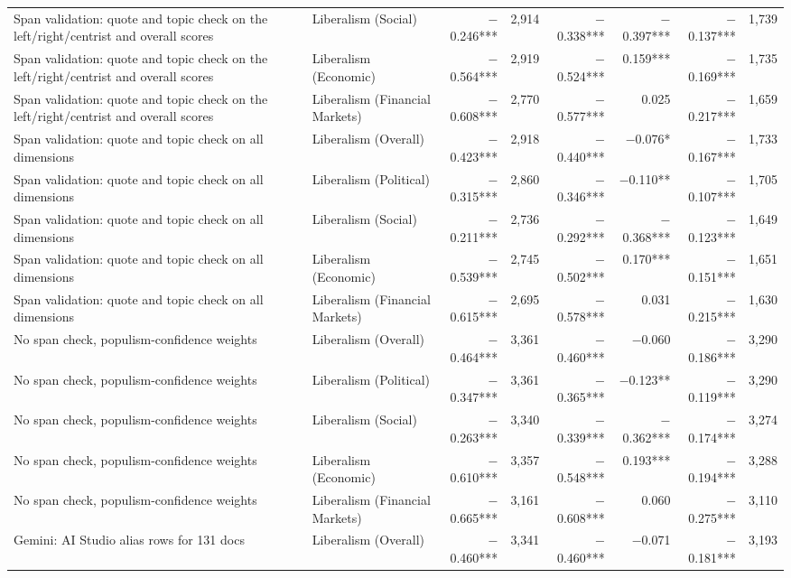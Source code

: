 \begin{table}[ht]
{\begin{tabular}{llrrrrrr}
Span validation: quote and topic check on the left/right/centrist and overall scores & Liberalism (Social) & $-$0.246*** & 2,914 & $-$0.338*** & $-$0.397*** & $-$0.137*** & 1,739 \\
Span validation: quote and topic check on the left/right/centrist and overall scores & Liberalism (Economic) & $-$0.564*** & 2,919 & $-$0.524*** & 0.159*** & $-$0.169*** & 1,735 \\
Span validation: quote and topic check on the left/right/centrist and overall scores & Liberalism (Financial Markets) & $-$0.608*** & 2,770 & $-$0.577*** & 0.025 & $-$0.217*** & 1,659 \\
Span validation: quote and topic check on all dimensions & Liberalism (Overall) & $-$0.423*** & 2,918 & $-$0.440*** & $-$0.076* & $-$0.167*** & 1,733 \\
Span validation: quote and topic check on all dimensions & Liberalism (Political) & $-$0.315*** & 2,860 & $-$0.346*** & $-$0.110** & $-$0.107*** & 1,705 \\
Span validation: quote and topic check on all dimensions & Liberalism (Social) & $-$0.211*** & 2,736 & $-$0.292*** & $-$0.368*** & $-$0.123*** & 1,649 \\
Span validation: quote and topic check on all dimensions & Liberalism (Economic) & $-$0.539*** & 2,745 & $-$0.502*** & 0.170*** & $-$0.151*** & 1,651 \\
Span validation: quote and topic check on all dimensions & Liberalism (Financial Markets) & $-$0.615*** & 2,695 & $-$0.578*** & 0.031 & $-$0.215*** & 1,630 \\
No span check, populism-confidence weights & Liberalism (Overall) & $-$0.464*** & 3,361 & $-$0.460*** & $-$0.060 & $-$0.186*** & 3,290 \\
No span check, populism-confidence weights & Liberalism (Political) & $-$0.347*** & 3,361 & $-$0.365*** & $-$0.123** & $-$0.119*** & 3,290 \\
No span check, populism-confidence weights & Liberalism (Social) & $-$0.263*** & 3,340 & $-$0.339*** & $-$0.362*** & $-$0.174*** & 3,274 \\
No span check, populism-confidence weights & Liberalism (Economic) & $-$0.610*** & 3,357 & $-$0.548*** & 0.193*** & $-$0.194*** & 3,288 \\
No span check, populism-confidence weights & Liberalism (Financial Markets) & $-$0.665*** & 3,161 & $-$0.608*** & 0.060 & $-$0.275*** & 3,110 \\
Gemini: AI Studio alias rows for 131 docs & Liberalism (Overall) & $-$0.460*** & 3,341 & $-$0.460*** & $-$0.071 & $-$0.181*** & 3,193 \\

\end{tabular}}
\end{table}
